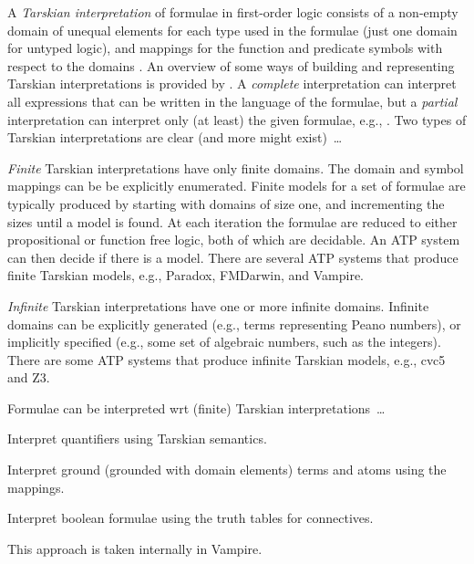 \documentclass{easychair}
\newenvironment{packed_itemize}{
\vspace*{-0.3em}
\begin{itemize}
\setlength{\partopsep}{0pt}
\setlength{\itemsep}{1pt}
\setlength{\parskip}{0pt}
\setlength{\parsep}{0pt}
}{\end{itemize}}
\begin{document}
A {\em Tarskian interpretation} \cite{TV56} of formulae in first-order logic consists of a 
non-empty domain of unequal elements for each type used in the formulae (just one domain for 
untyped logic), and mappings for the function and predicate symbols with respect to the 
domains \cite{Hun96,Gal15}.
An overview of some ways of building and representing Tarskian interpretations is provided 
by \cite{CLP04}.
A {\em complete} interpretation can interpret all expressions that can be written in the language 
of the formulae, but a {\em partial} interpretation can interpret only (at least) the 
given formulae, e.g., \cite{BSW23}.
Two types of Tarskian interpretations are clear (and more might exist)~\ldots
\begin{packed_itemize}
\item {\em Finite} Tarskian interpretations have only finite domains.
      The domain and symbol mappings can be be explicitly enumerated.
      Finite models for a set of formulae are typically produced by starting with domains of 
      size one, and incrementing the sizes until a model is found.
      At each iteration the formulae are reduced to either propositional 
      \cite{CS03,McC03-MACE4-TR} or function free \cite{BF+09} logic, both of which are decidable.
      An ATP system can then decide if there is a model.
      There are several ATP systems that produce finite Tarskian models, e.g., Paradox, FMDarwin, 
      and Vampire.
\item {\em Infinite} Tarskian interpretations have one or more infinite domains.
      Infinite domains can be explicitly generated (e.g., terms representing Peano numbers), 
      or implicitly specified (e.g., some set of algebraic numbers, such as the integers).
      There are some ATP systems that produce infinite Tarskian models, e.g., 
      cvc5 \cite{BB+22-cvc5} and Z3.
\end{packed_itemize}
\vspace*{-0.5em}
Formulae can be interpreted wrt (finite) Tarskian interpretations~\ldots
\begin{packed_itemize}
\item Interpret quantifiers using Tarskian semantics.
\item Interpret ground (grounded with domain elements) terms and atoms using the mappings.
\item Interpret boolean formulae using the truth tables for connectives.
\end{packed_itemize}
\vspace*{-0.5em}
This approach is taken internally in Vampire.
\end{document}

